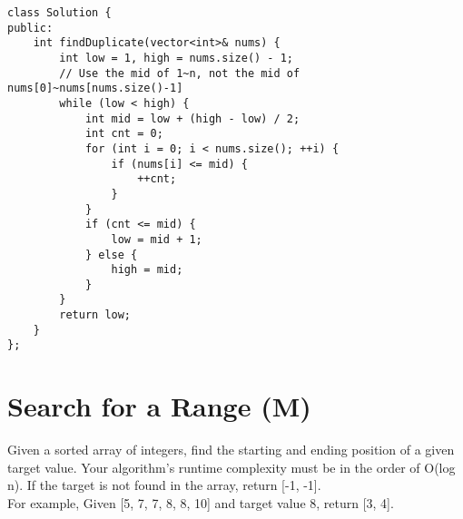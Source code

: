 \begin{lstlisting}
class Solution {
public:
    int findDuplicate(vector<int>& nums) {
        int low = 1, high = nums.size() - 1;
        // Use the mid of 1~n, not the mid of nums[0]~nums[nums.size()-1]
        while (low < high) {
            int mid = low + (high - low) / 2; 
            int cnt = 0;
            for (int i = 0; i < nums.size(); ++i) {
                if (nums[i] <= mid) {
                    ++cnt;
                }
            }
            if (cnt <= mid) {
                low = mid + 1;
            } else {
                high = mid;
            }
        }
        return low;
    }
};
\end{lstlisting}


\section{Search for a Range (M)}
Given a sorted array of integers, find the starting and ending position of a given target value. Your algorithm's runtime complexity must be in the order of O(log n). If the target is not found in the array, return [-1, -1].\\

For example,
Given [5, 7, 7, 8, 8, 10] and target value 8,
return [3, 4]. \\

